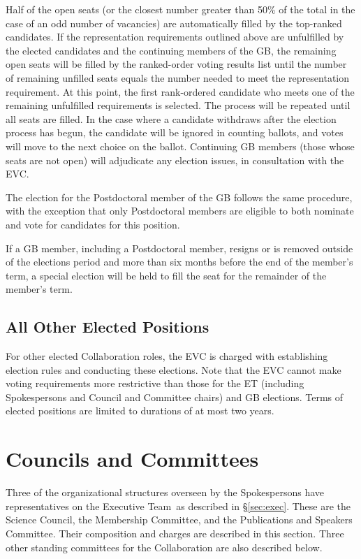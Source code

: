 \documentclass[12pt]{article}
\newcommand{\exec}{{Executive Team}}
\begin{document}
Half of the open seats (or the closest number greater than 50\% of the total in the case of an odd number of vacancies) are automatically filled by the top-ranked candidates. If the representation requirements outlined above are unfulfilled by the elected candidates and the continuing members of the GB, the remaining open seats will be filled by the ranked-order voting results list until the number of remaining unfilled seats equals the number needed to meet the representation requirement.  At this point, the first rank-ordered candidate who meets one of the remaining unfulfilled requirements is selected. The process will be repeated until all seats are filled. In the case where a candidate withdraws after the election process has begun, the candidate will be ignored in counting ballots, and votes will move to the next choice on the ballot. Continuing GB members (those whose seats are not open) will adjudicate any election issues, in consultation with the EVC.

The election for the Postdoctoral member of the GB follows the same procedure, with the exception that only Postdoctoral members are eligible to both nominate and vote for candidates for this position.

If a GB member, including a Postdoctoral member, resigns or is removed outside of the elections period and more than six months before the end of the member's term, a special election will be held to fill the seat for the remainder of the member's term.

\subsection{All Other Elected Positions}

For other elected Collaboration roles, the EVC is charged with establishing election rules and conducting these elections. Note that the EVC cannot make voting requirements more restrictive than those for the ET (including Spokespersons and Council and Committee chairs) and GB elections. Terms of elected positions are limited to durations of at most two years.

\section{Councils and Committees}
\label{sec:councils}

Three of the organizational structures overseen by the Spokespersons have representatives on the \exec\ as described in \S\ref{sec:exec}.  These are the Science Council, the Membership Committee, and the Publications and Speakers Committee.  Their composition and charges are described in this section.  Three other standing committees for the Collaboration are also described below.
\end{document}
